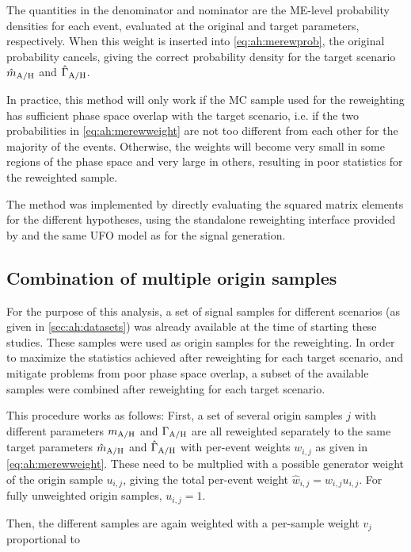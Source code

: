 The quantities in the denominator and nominator are the ME-level probability densities for each event, evaluated at the original and target \AH parameters, respectively. When this weight is inserted into \cref{eq:ah:merewprob}, the original probability cancels, giving the correct probability density for the target scenario $\hat{m}_{\mathrm{A/H}}$ and $\hat{\Gamma}_{\mathrm{A/H}}$.

In practice, this method will only work if the MC sample used for the reweighting has sufficient phase space overlap with the target \AH scenario, i.e. if the two probabilities in \cref{eq:ah:merewweight} are not too different from each other for the majority of the events. Otherwise, the weights will become very small in some regions of the phase space and very large in others, resulting in poor statistics for the reweighted sample.

The method was implemented by directly evaluating the squared matrix elements for the different \AH hypotheses, using the standalone reweighting interface provided by \madgraph and the same UFO model as for the signal generation. 

\subsection{Combination of multiple origin samples}

For the purpose of this analysis, a set of signal samples for different \AH scenarios (as given in \cref{sec:ah:datasets}) was already available at the time of starting these studies. These samples were used as origin samples for the reweighting. In order to maximize the statistics achieved after reweighting for each target \AH scenario, and mitigate problems from poor phase space overlap, a subset of the available samples were combined after reweighting for each target scenario.

This procedure works as follows: First, a set of several origin samples $j$ with different parameters $m_{\mathrm{A/H}}$ and $\Gamma_{\mathrm{A/H}}$ are all reweighted separately to the same target parameters $\hat{m}_{\mathrm{A/H}}$ and $\hat{\Gamma}_{\mathrm{A/H}}$ with per-event weights $w_{i,j}$ as given in \cref{eq:ah:merewweight}. These need to be multplied with a possible generator weight of the origin sample $u_{i,j}$, giving the total per-event weight $\hat{w}_{i,j} = w_{i,j} u_{i,j}$. For fully unweighted origin samples, $u_{i,j} = 1$. 

Then, the different samples are again weighted with a per-sample weight $v_j$ proportional to

